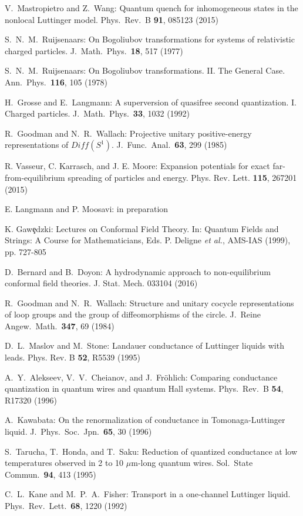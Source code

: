 \documentclass[12pt,a4paper]{article}
\theoremstyle{definition}
\theoremstyle{remark}
\begin{document}
\begin{thebibliography}{99}
 V.\ Mastropietro and Z.\ Wang:
Quantum quench for inhomogeneous states in the nonlocal Luttinger model. 
Phys.\ Rev.\ B {\bf 91}, 085123 (2015)

 S.\ N.\ M.\ Ruijsenaars:
On Bogoliubov transformations for systems of relativistic charged particles.
J.\ Math.\ Phys.\ {\bf 18}, 517 (1977)

 S.\ N.\ M.\ Ruijsenaars:
On Bogoliubov transformations. II. The General Case.
Ann.\ Phys.\ {\bf 116}, 105 (1978)

 H.\ Grosse and E.\ Langmann:
A superversion of quasifree second quantization. I. Charged particles.
J.\ Math.\ Phys.\ {\bf 33}, 1032 (1992)

 R.\ Goodman and N.\ R.\ Wallach:
Projective unitary positive-energy representations of $Diff(S^1)$.
J.\ Func.\ Anal.\ {\bf 63}, 299 (1985) 

 R. Vasseur, C. Karrasch, and J. E. Moore: Expansion potentials
for exact far-from-equilibrium spreading of particles and energy.
Phys. Rev. Lett. {\bf115}, 267201 (2015)

 E. Langmann and P. Moosavi: in preparation

 K. Gaw\c{e}dzki: Lectures on Conformal Field Theory. In: Quantum
Fields and Strings: A Course for Mathematicians, Eds. P. Deligne {\it et al.}, 
AMS-IAS (1999), pp. 727-805

 D.\ Bernard and B.\ Doyon: A hydrodynamic approach to 
non-equilibrium conformal field theories. J. Stat. Mech. 033104 (2016)

 R.\ Goodman and N.\ R.\ Wallach:
Structure and unitary cocycle representations of loop groups and the group
of diffeomorphisms of the circle.
J.\ Reine Angew.\ Math.\ {\bf 347}, 69 (1984)

 D.\ L.\ Maslov and M.\ Stone:
Landauer conductance of Luttinger liquids with leads.
Phys. Rev. B {\bf 52}, R5539 (1995)

 A.\ Y.\ Alekseev, V.\ V.\ Cheianov, and J.\ Fr{\"o}hlich:
Comparing conductance quantization in quantum wires and quantum Hall systems.
Phys.\ Rev.\ B {\bf 54}, R17320 (1996)

 A.\ Kawabata:
On the renormalization of conductance in Tomonaga-Luttinger liquid.
J.\ Phys.\ Soc.\ Jpn.\ {\bf 65}, 30 (1996)

 S.\ Tarucha, T.\ Honda, and T.\ Saku:
Reduction of quantized conductance at low temperatures observed in 2 to 10 $\mu$m-long quantum wires.
Sol.\ State Commun.\ {\bf 94}, 413 (1995) 

 C.\ L.\ Kane and M.\ P.\ A.\ Fisher:
Transport in a one-channel Luttinger liquid.
Phys.\ Rev.\ Lett.\ {\bf 68}, 1220 (1992)

\end{thebibliography}

\end{document}
